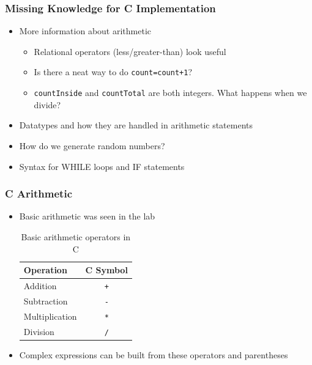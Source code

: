 \documentclass[14pt]{beamer}
\begin{document}
\begin{frame}
\frametitle{Missing Knowledge for C Implementation}
\begin{itemize}
\item More information about arithmetic
\begin{itemize}
	\item Relational operators (less/greater-than) look useful
	\item Is there a neat way to do \texttt{count=count+1}?
	\item \texttt{countInside} and \texttt{countTotal} are both integers. What happens when we divide?
\end{itemize}
\item Datatypes and how they are handled in arithmetic statements
\item How do we generate random numbers?
\item Syntax for WHILE loops and IF statements
\end{itemize}
\end{frame}

\begin{frame}
\frametitle{C Arithmetic}
\begin{itemize}
\item Basic arithmetic was seen in the lab
\begin{table}[H]
\centering
\begin{tabular}{|l|c|}
\hline
Operation      & C Symbol \\
\hline
Addition       & \texttt{+}        \\
Subtraction    & \texttt{-}        \\
Multiplication & \texttt{*}        \\
Division       & \texttt{/}       \\
\hline
\end{tabular}
\caption{Basic arithmetic operators in C}
\end{table}
\item Complex expressions can be built from these operators and parentheses
\end{itemize}
\end{frame}
\end{document}
